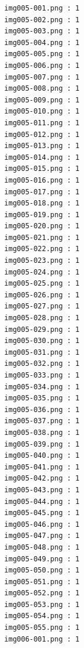 \documentclass[12pt,a4paper]{article}
\begin{document}
\begin{lstlisting}
                     img005-001.png : 1
                     img005-002.png : 1
                     img005-003.png : 1
                     img005-004.png : 1
                     img005-005.png : 1
                     img005-006.png : 1
                     img005-007.png : 1
                     img005-008.png : 1
                     img005-009.png : 1
                     img005-010.png : 1
                     img005-011.png : 1
                     img005-012.png : 1
                     img005-013.png : 1
                     img005-014.png : 1
                     img005-015.png : 1
                     img005-016.png : 1
                     img005-017.png : 1
                     img005-018.png : 1
                     img005-019.png : 1
                     img005-020.png : 1
                     img005-021.png : 1
                     img005-022.png : 1
                     img005-023.png : 1
                     img005-024.png : 1
                     img005-025.png : 1
                     img005-026.png : 1
                     img005-027.png : 1
                     img005-028.png : 1
                     img005-029.png : 1
                     img005-030.png : 1
                     img005-031.png : 1
                     img005-032.png : 1
                     img005-033.png : 1
                     img005-034.png : 1
                     img005-035.png : 1
                     img005-036.png : 1
                     img005-037.png : 1
                     img005-038.png : 1
                     img005-039.png : 1
                     img005-040.png : 1
                     img005-041.png : 1
                     img005-042.png : 1
                     img005-043.png : 1
                     img005-044.png : 1
                     img005-045.png : 1
                     img005-046.png : 1
                     img005-047.png : 1
                     img005-048.png : 1
                     img005-049.png : 1
                     img005-050.png : 1
                     img005-051.png : 1
                     img005-052.png : 1
                     img005-053.png : 1
                     img005-054.png : 1
                     img005-055.png : 1
                     img006-001.png : 1




\end{lstlisting}
\end{document}

